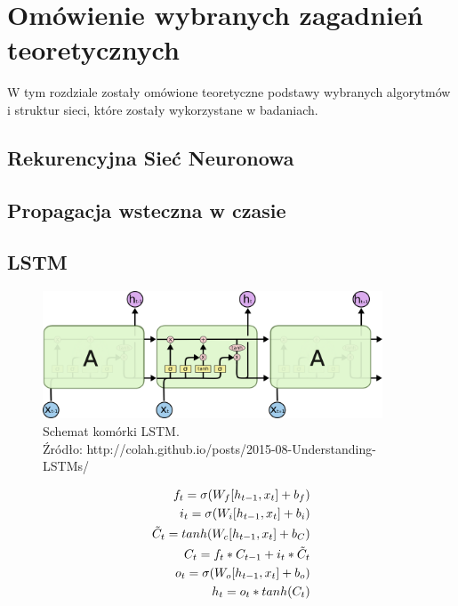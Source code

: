 \documentclass[oneside, mag]{mgr}
\begin{document}
\chapter{Omówienie wybranych zagadnień teoretycznych}

W tym rozdziale zostały omówione teoretyczne podstawy wybranych algorytmów i struktur sieci, które zostały wykorzystane w badaniach.

\section{Rekurencyjna Sieć Neuronowa}

\section{Propagacja wsteczna w czasie}

\section{LSTM}

\begin{figure}
\centering
	\includegraphics[width=0.90\textwidth]{img/lstm_colah.png}
	\caption{Schemat komórki LSTM.\\ Źródło: http://colah.github.io/posts/2015-08-Understanding-LSTMs/}
	\label{fig:lstm}
\end{figure}

\begin{equation}
\centering
\begin{split}
	f_t = \sigma( W_f [ h_{t-1}, x_t ] + b_f ) \\
	i_t = \sigma( W_i [ h_{t-1}, x_t ] + b_i ) \\
	\tilde{C}_t = tanh( W_c [ h_{t-1}, x_t ] + b_C ) \\
	C_t = f_t * C_{t-1} + i_t * \tilde{C}_t \\
	o_t = \sigma( W_o [ h_{t-1}, x_t ] + b_o ) \\
	h_t = o_t * tanh( C_t )
\end{split}
\end{equation}
\end{document}
